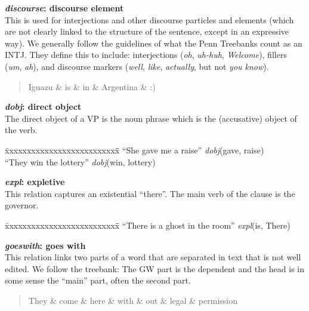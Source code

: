 \documentclass[11pt,letterpaper]{article}
\begin{document}
\noindent\textbf{\emph{discourse}: discourse element}\\
This is used for interjections and other discourse particles and
elements (which are not clearly linked to the structure of the
sentence, except in an expressive way). We generally follow the
guidelines of what the Penn Treebanks count as an INTJ.  They
define this to include: interjections (\emph{oh}, \emph{uh-huh},
\emph{Welcome}), fillers (\emph{um}, \emph{ah}), and discourse
markers (\emph{well}, \emph{like}, \emph{actually}, but not \emph{you know}).
\begin{quote}
\begin{dependency}
   \begin{deptext}[column sep=0.25cm]
      Iguazu \& is \& in \& Argentina \& :) \\
   \end{deptext}
\end{dependency}
\end{quote}

\noindent\textbf{\emph{dobj}: direct object}\\
The direct object of a VP is the noun phrase which is the (accusative) object of the verb.
\begin{tabbing}
\hspace{1cm} \= xxxxxxxxxxxxxxxxxxxxxxxxxx\= \hspace{.5cm}\=  \kill
\>  ``She gave me a raise'' \> \> \emph{dobj}(gave, raise)\\
\hspace{1cm} \> ``They win the lottery'' \> \>  \emph{dobj}(win, lottery)\\
\end{tabbing}


\noindent\textbf{\emph{expl}: expletive}\\
This relation captures an existential ``there''. The main verb of the clause is the governor.
\begin{tabbing}
\hspace{1cm} \= xxxxxxxxxxxxxxxxxxxxxxxxxx\= \hspace{.5cm}\=  \kill
\> ``There is a ghost in the room'' \>\> \emph{expl}(is, There)\\
\end{tabbing}

\noindent\textbf{\emph{goeswith}: goes with}\\
This relation links two parts of a word that are separated in text
that is not well edited. We follow the treebank: The GW part is the
dependent and the head is in some sense the ``main'' part, often the
second part.
\begin{quote}
\begin{dependency}
   \begin{deptext}[column sep=0.2em]
      They \& come \& here \& with \& out \& legal \& permission \\
   \end{deptext}
\end{dependency}
\end{quote}
\end{document}
